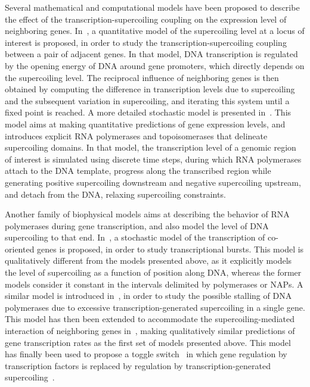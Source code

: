 Several mathematical and computational models have been proposed to describe the effect of the transcription-supercoiling coupling on the expression level of neighboring genes.
In~\cite{meyer2014}, a quantitative model of the supercoiling level at a locus of interest is proposed, in order to study the transcription-supercoiling coupling between a pair of adjacent genes.
In that model, DNA transcription is regulated by the opening energy of DNA around gene promoters, which directly depends on the supercoiling level.
The reciprocal influence of neighboring genes is then obtained by computing the difference in transcription levels due to supercoiling and the subsequent variation in supercoiling, and iterating this system until a fixed point is reached.
A more detailed stochastic model is presented in~\cite{elhoudaigui2019}.
This model aims at making quantitative predictions of gene expression levels, and introduces explicit RNA polymerases and topoisomerases that delineate supercoiling domains.
In that model, the transcription level of a genomic region of interest is simulated using discrete time steps, during which RNA polymerases attach to the DNA template, progress along the transcribed region while generating positive supercoiling downstream and negative supercoiling upstream, and detach from the DNA, relaxing supercoiling constraints.

Another family of biophysical models aims at describing the behavior of RNA polymerases during gene transcription, and also model the level of DNA supercoiling to that end.
In~\cite{brackley2016}, a stochastic model of the transcription of co-oriented genes is proposed, in order to study transcriptional bursts.
This model is qualitatively different from the models presented above, as it explicitly models the level of supercoiling as a function of position along DNA, whereas the former models consider it constant in the intervals delimited by polymerases or NAPs.
A similar model is introduced in~\cite{sevier2017}, in order to study the possible stalling of DNA polymerases due to excessive transcription-generated supercoiling in a single gene.
This model has then been extended to accommodate the supercoiling-mediated interaction of neighboring genes in~\cite{sevier2018}, making qualitatively similar predictions of gene transcription rates as the first set of models presented above.
This model has finally been used to propose a toggle switch~\citep{gardner2000} in which gene regulation by transcription factors is replaced by regulation by transcription-generated supercoiling~\citep{sevier2021}.

